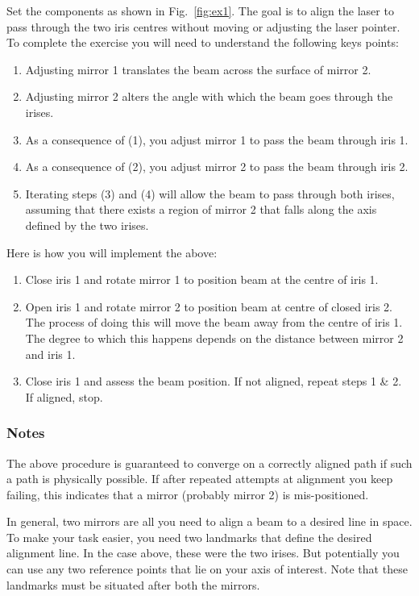 \documentclass[a4paper]{report}
\begin{document}
Set the components as shown in Fig.~\ref{fig:ex1}. 
The goal is to align the laser to pass through the two iris centres without moving or adjusting the laser pointer. 
To complete the exercise you will need to understand the following keys points:

\begin{enumerate}
\item Adjusting mirror 1 translates the beam across the surface of mirror 2.
\item Adjusting mirror 2 alters the angle with which the beam goes through the irises. 
\item As a consequence of (1), you adjust mirror 1 to pass the beam through iris 1.
\item As a consequence of (2), you adjust mirror 2 to pass the beam through iris 2.
\item Iterating steps (3) and (4) will allow the beam to pass through both irises, assuming that there exists a region of mirror 2 that falls along the axis defined by the two irises. 
\end{enumerate}


Here is how you will implement the above:

\begin{enumerate}
\item Close iris 1 and rotate mirror 1 to position beam at the centre of iris 1.
\item Open iris 1 and rotate mirror 2 to position beam at centre of closed iris 2. 
The process of doing this will move the beam away from the centre of iris 1. 
The degree to which this happens depends on the distance between mirror 2 and iris 1.
\item Close iris 1 and assess the beam position. If not aligned, repeat steps 1 \& 2. 
If aligned, stop. 
\end{enumerate}

\subsubsection{Notes}

The above procedure is guaranteed to converge on a correctly aligned path if such a path is physically possible. 
 If after repeated attempts at alignment you keep failing, this indicates that a mirror (probably mirror 2) is mis-positioned. 

In general, two mirrors are all you need to align a beam to a desired line in space. 
To make your task easier, you need two landmarks that define the desired alignment line. 
In the case above, these were the two irises. 
But potentially you can use any two reference points that lie on your axis of interest. 
Note that these landmarks must be situated after both the mirrors.
\end{document}
